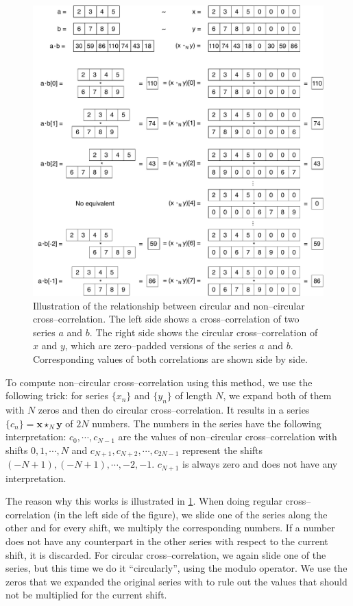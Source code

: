 \begin{figure}
	\centering
	\includegraphics[width=\textwidth]{img/circ-cross-example}
	\caption{Illustration of the relationship between circular and non--circular cross--correlation. The left side shows a cross--correlation of two series $a$ and $b$. The right side shows the circular cross--correlation of $x$ and $y$, which are zero--padded versions of the series $a$ and $b$. Corresponding values of both correlations are shown side by side.}
	\label{circ-cross-example}
\end{figure}

To compute non--circular cross--correlation using this method, we use the following trick: for series $\{x_n\}$ and $\{y_n\}$ of length $N$, we expand both of them with $N$ zeros and then do circular cross--correlation. It results in a series $\{c_n\} = \mathbf{x} \star_N \mathbf{y}$ of $2N$ numbers. The numbers in the series have the following interpretation: $c_0, \cdots, c_{N-1}$ are the values of non--circular cross--correlation with shifts $0, 1, \cdots, N$ and $c_{N+1}, c_{N+2}, \cdots, c_{2N-1}$ represent the shifts $(-N+1), (-N+1), \cdots, -2, -1$. $c_{N+1}$ is always zero and does not have any interpretation.

The reason why this works is illustrated in \cref{circ-cross-example}. When doing regular cross--correlation (in the left side of the figure), we slide one of the series along the other and for every shift, we multiply the corresponding numbers. If a number does not have any counterpart in the other series with respect to the current shift, it is discarded. For circular cross--correlation, we again slide one of the series, but this time we do it ``circularly'', using the modulo operator. We use the zeros that we expanded the original series with to rule out the values that should not be multiplied for the current shift.

